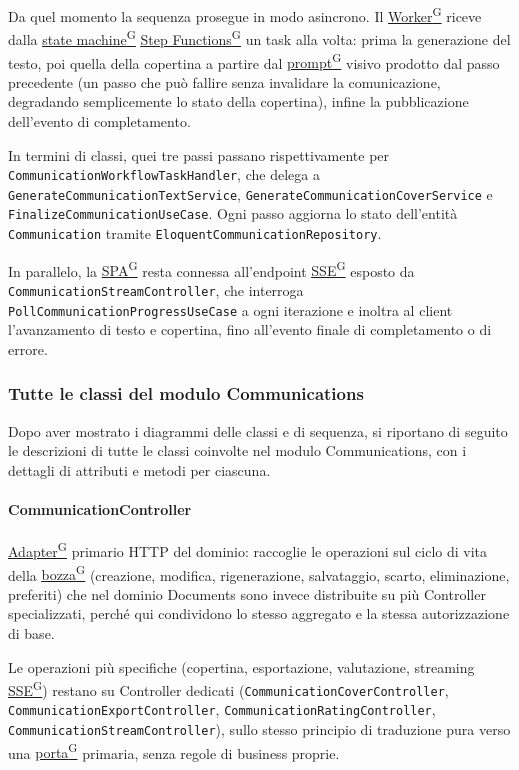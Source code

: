 \documentclass[a4paper,12pt]{article}
\providecommand{\glslink}[2]{\href{https://alittlebyte-19.github.io/Documentazione/glossario.html\#gls-#1}{\underline{#2}\textsuperscript{\scriptsize G}}}
\begin{document}
\begin{sloppypar}
Da quel momento la sequenza prosegue in modo asincrono. Il \glslink{worker}{Worker} riceve dalla \glslink{state-machine}{state machine} \glslink{step-functions}{Step Functions} un task alla volta: prima la generazione del testo, poi quella della copertina a partire dal \glslink{prompt}{prompt} visivo prodotto dal passo precedente (un passo che può fallire senza invalidare la comunicazione, degradando semplicemente lo stato della copertina), infine la pubblicazione dell'evento di completamento.

In termini di classi, quei tre passi passano rispettivamente per \texttt{CommunicationWorkflowTaskHandler}, che delega a \texttt{GenerateCommunicationTextService}, \texttt{GenerateCommunicationCoverService} e \texttt{FinalizeCommunicationUseCase}. Ogni passo aggiorna lo stato dell'entità \texttt{Communication} tramite \texttt{EloquentCommunicationRepository}.

In parallelo, la \glslink{spa-single-page-application}{SPA} resta connessa all'endpoint \glslink{sse-server-sent-events}{SSE} esposto da \texttt{CommunicationStreamController}, che interroga \texttt{PollCommunicationProgressUseCase} a ogni iterazione e inoltra al client l'avanzamento di testo e copertina, fino all'evento finale di completamento o di errore.

\subsubsection{Tutte le classi del modulo Communications}

Dopo aver mostrato i diagrammi delle classi e di sequenza, si riportano di seguito le descrizioni di tutte le classi coinvolte nel modulo Communications, con i dettagli di attributi e metodi per ciascuna.

\paragraph{CommunicationController}

\glslink{adapter}{Adapter} primario HTTP del dominio: raccoglie le operazioni sul ciclo di vita della \glslink{bozza-draft}{bozza} (creazione, modifica, rigenerazione, salvataggio, scarto, eliminazione, preferiti) che nel dominio Documents sono invece distribuite su più Controller specializzati, perché qui condividono lo stesso aggregato e la stessa autorizzazione di base.

Le operazioni più specifiche (copertina, esportazione, valutazione, streaming \glslink{sse-server-sent-events}{SSE}) restano su Controller dedicati (\texttt{CommunicationCoverController}, \texttt{CommunicationExportController}, \texttt{CommunicationRatingController}, \texttt{CommunicationStreamController}), sullo stesso principio di traduzione pura verso una \glslink{porta}{porta} primaria, senza regole di business proprie.


\end{sloppypar}
\end{document}
